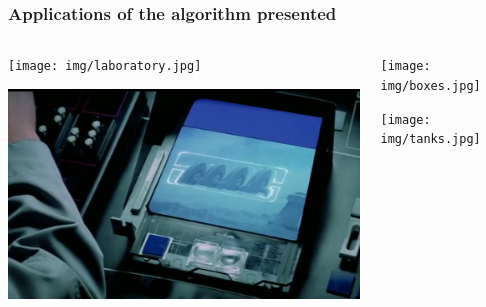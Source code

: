 \begin{frame}
  \frametitle{Applications of the algorithm presented}
  \begin{columns}
    \begin{column}{0.5\textwidth}
    \texttt{[image: img/laboratory.jpg]}

    \includegraphics[width=\textwidth]{img/hoth.png}
    \end{column}
    \begin{column}{0.5\textwidth}
    \texttt{[image: img/boxes.jpg]}

    \texttt{[image: img/tanks.jpg]}
    \end{column}
  \end{columns}
\end{frame}

